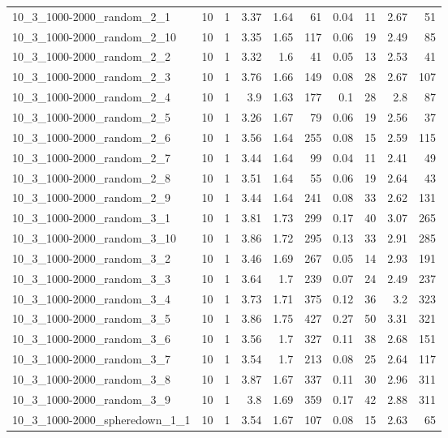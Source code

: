 \begin{center}
\begin{scriptsize}
\begin{longtable}{lrrrrrrrrr}
10\_3\_1000-2000\_random\_2\_1 & 10 & 1 & 3.37 & 1.64 & 61 & 0.04 & 11 & 2.67 & 51\\
10\_3\_1000-2000\_random\_2\_10 & 10 & 1 & 3.35 & 1.65 & 117 & 0.06 & 19 & 2.49 & 85\\
10\_3\_1000-2000\_random\_2\_2 & 10 & 1 & 3.32 & 1.6 & 41 & 0.05 & 13 & 2.53 & 41\\
10\_3\_1000-2000\_random\_2\_3 & 10 & 1 & 3.76 & 1.66 & 149 & 0.08 & 28 & 2.67 & 107\\
10\_3\_1000-2000\_random\_2\_4 & 10 & 1 & 3.9 & 1.63 & 177 & 0.1 & 28 & 2.8 & 87\\
10\_3\_1000-2000\_random\_2\_5 & 10 & 1 & 3.26 & 1.67 & 79 & 0.06 & 19 & 2.56 & 37\\
10\_3\_1000-2000\_random\_2\_6 & 10 & 1 & 3.56 & 1.64 & 255 & 0.08 & 15 & 2.59 & 115\\
10\_3\_1000-2000\_random\_2\_7 & 10 & 1 & 3.44 & 1.64 & 99 & 0.04 & 11 & 2.41 & 49\\
10\_3\_1000-2000\_random\_2\_8 & 10 & 1 & 3.51 & 1.64 & 55 & 0.06 & 19 & 2.64 & 43\\
10\_3\_1000-2000\_random\_2\_9 & 10 & 1 & 3.44 & 1.64 & 241 & 0.08 & 33 & 2.62 & 131\\
10\_3\_1000-2000\_random\_3\_1 & 10 & 1 & 3.81 & 1.73 & 299 & 0.17 & 40 & 3.07 & 265\\
10\_3\_1000-2000\_random\_3\_10 & 10 & 1 & 3.86 & 1.72 & 295 & 0.13 & 33 & 2.91 & 285\\
10\_3\_1000-2000\_random\_3\_2 & 10 & 1 & 3.46 & 1.69 & 267 & 0.05 & 14 & 2.93 & 191\\
10\_3\_1000-2000\_random\_3\_3 & 10 & 1 & 3.64 & 1.7 & 239 & 0.07 & 24 & 2.49 & 237\\
10\_3\_1000-2000\_random\_3\_4 & 10 & 1 & 3.73 & 1.71 & 375 & 0.12 & 36 & 3.2 & 323\\
10\_3\_1000-2000\_random\_3\_5 & 10 & 1 & 3.86 & 1.75 & 427 & 0.27 & 50 & 3.31 & 321\\
10\_3\_1000-2000\_random\_3\_6 & 10 & 1 & 3.56 & 1.7 & 327 & 0.11 & 38 & 2.68 & 151\\
10\_3\_1000-2000\_random\_3\_7 & 10 & 1 & 3.54 & 1.7 & 213 & 0.08 & 25 & 2.64 & 117\\
10\_3\_1000-2000\_random\_3\_8 & 10 & 1 & 3.87 & 1.67 & 337 & 0.11 & 30 & 2.96 & 311\\
10\_3\_1000-2000\_random\_3\_9 & 10 & 1 & 3.8 & 1.69 & 359 & 0.17 & 42 & 2.88 & 311\\
10\_3\_1000-2000\_spheredown\_1\_1 & 10 & 1 & 3.54 & 1.67 & 107 & 0.08 & 15 & 2.63 & 65\\

\end{longtable}
\end{scriptsize}
\end{center}
